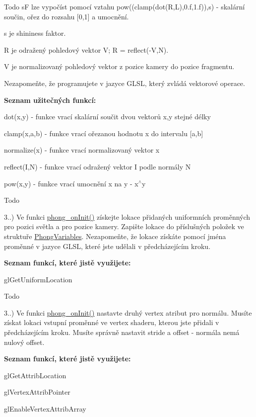 \begin{DoxyRefDesc}{Todo}
 s\-F lze vypočíst pomocí vztahu pow((clamp(dot(\-R,\-L),0.\-f,1.\-f)),s) -\/ skalární součin, ořez do rozsahu \mbox{[}0,1\mbox{]} a umocnění.\par
 s je shininess faktor.\par
 R je odražený pohledový vektor V; R = reflect(-\/\-V,N).\par
 V je normalizovaný pohledový vektor z pozice kamery do pozice fragmentu.\par
 \par
 Nezapomeňte, že programujete v jazyce G\-L\-S\-L, který zvládá vektorové operace.\par
 {\bfseries Seznam užitečných funkcí\-:}
\begin{DoxyItemize}
\item dot(x,y) -\/ funkce vrací skalární součit dvou vektorů x,y stejné délky
\item clamp(x,a,b) -\/ funkce vrací ořezanou hodnotu x do intervalu \mbox{[}a,b\mbox{]}
\item normalize(x) -\/ funkce vrací normalizovaný vektor x
\item reflect(\-I,\-N) -\/ funkce vrací odražený vektor I podle normály N
\item pow(x,y) -\/ funkce vrací umocnění x na y -\/ x$^\wedge$y 
\end{DoxyItemize}\end{DoxyRefDesc}
\begin{DoxyRefDesc}{Todo}
\item[\hyperlink{todo__todo000006}{Todo}]3..) Ve funkci \hyperlink{student_8h_ac2adb2ba4e748239b9db4d037584d3cc}{phong\-\_\-on\-Init()} získejte lokace přidaných uniformních proměnných pro pozici světla a pro pozice kamery. Zapište lokace do příslušných položek ve struktuře \hyperlink{structPhongVariables}{Phong\-Variables}. Nezapomeňte, že lokace získáte pomocí jména proměnné v jazyce G\-L\-S\-L, které jste udělali v předcházejícím kroku.\par
 {\bfseries Seznam funkcí, které jistě využijete\-:}
\begin{DoxyItemize}
\item gl\-Get\-Uniform\-Location 
\end{DoxyItemize}\end{DoxyRefDesc}


\begin{DoxyRefDesc}{Todo}
\item[\hyperlink{todo__todo000007}{Todo}]3..) Ve funkci \hyperlink{student_8h_ac2adb2ba4e748239b9db4d037584d3cc}{phong\-\_\-on\-Init()} nastavte druhý vertex atribut pro normálu. Musíte získat lokaci vstupní proměnné ve vertex shaderu, kterou jste přidali v předcházejícím kroku. Musíte správně nastavit stride a offset -\/ normála nemá nulový offset.\par
 {\bfseries Seznam funkcí, které jistě využijete\-:}
\begin{DoxyItemize}
\item gl\-Get\-Attrib\-Location
\item gl\-Vertex\-Attrib\-Pointer
\item gl\-Enable\-Vertex\-Attrib\-Array 
\end{DoxyItemize}\end{DoxyRefDesc}


